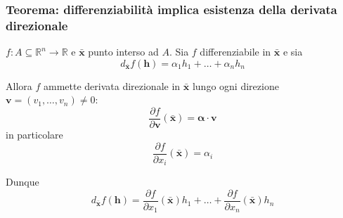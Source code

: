 \documentclass[x11names]{article}
\begin{document}
	\begin{center}
		\colorbox{myred}{\begin{minipage}{5.75in}
				\begin{redes}{}
					\subsubsection{Teorema: differenziabilità implica esistenza della derivata direzionale}
					\(f: A\subseteq \mathbb{R}^n \to \mathbb{R}\) e \(\boldsymbol{\bar{x}}\) punto interso ad \(A\). Sia \(f\) differenziabile in \(\boldsymbol{\bar{x}}\) e sia 
					\[
					d_{\boldsymbol{\bar{x}}}f(\boldsymbol{h}) = \alpha_{1}h_{1} + \dots + \alpha_{n}h_{n}
					\]
					
					Allora \(f\) ammette derivata direzionale in \(\boldsymbol{\bar{x}}\) lungo ogni direzione \(\boldsymbol{v}=(v_{1},\dots,v_{n}) \neq 0\):
					\[ 
					\frac{\partial f}{\partial \boldsymbol{v}}(\boldsymbol{\bar{x}}) = \boldsymbol{\alpha}\cdot \boldsymbol{v}
					\]
					in particolare
					\[ 
					\frac{\partial f}{\partial x_{i}}(\boldsymbol{\bar{x}}) = \alpha_{i}
					\]
					
					Dunque
					\[ 
					d_{\boldsymbol{\bar{x}}}f(\boldsymbol{h}) = \frac{\partial f}{\partial x_{1}}(\boldsymbol{\bar{x}})h_{1} + \dots +\frac{\partial f}{\partial x_{n}}(\boldsymbol{\bar{x}})h_{n} 
					\]
				\end{redes}
		\end{minipage}}        
	\end{center}
\end{document}

